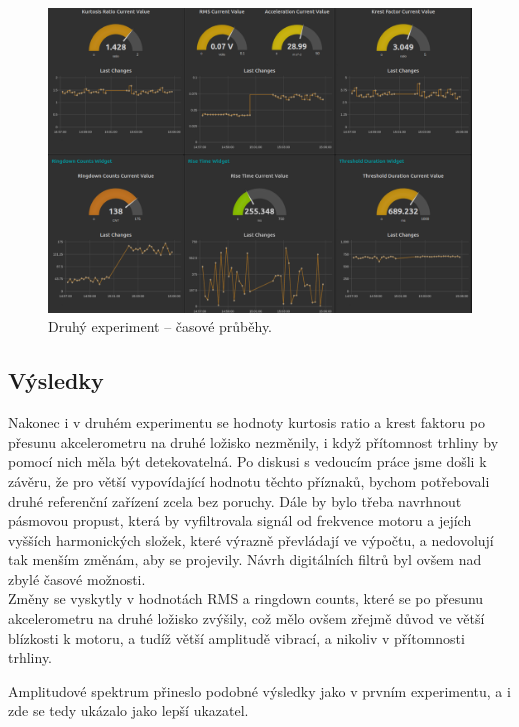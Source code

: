         \begin{figure}[!ht]
            \centering
    	    \includegraphics[width=\textwidth]{Experiment/Figs/sterbina_300rpm_1khZ2.png}
            \caption {Druhý experiment – časové průběhy.}
            \label{figure:experiment_graphs02}
        \end{figure}
        

    
    \subsection{Výsledky}  
        Nakonec i v druhém experimentu se hodnoty kurtosis ratio a krest faktoru po přesunu akcelerometru na druhé ložisko nezměnily, i když přítomnost trhliny by pomocí nich měla být detekovatelná. Po diskusi s vedoucím práce jsme došli k závěru, že pro větší vypovídající hodnotu těchto příznaků, bychom potřebovali druhé referenční zařízení zcela bez poruchy. Dále by bylo třeba navrhnout pásmovou propust, která by vyfiltrovala signál od frekvence motoru a jejích vyšších harmonických složek, které výrazně převládají ve výpočtu, a nedovolují tak menším změnám, aby se projevily. Návrh digitálních filtrů byl ovšem nad zbylé časové možnosti.\\
        Změny se vyskytly v hodnotách RMS a ringdown counts, které se po přesunu akcelerometru na druhé ložisko zvýšily, což mělo ovšem zřejmě důvod ve větší blízkosti k motoru, a tudíž větší amplitudě vibrací, a nikoliv v přítomnosti trhliny.
        
        Amplitudové spektrum přineslo podobné výsledky jako v prvním experimentu, a i zde se tedy ukázalo jako lepší ukazatel.
        
     
        
        